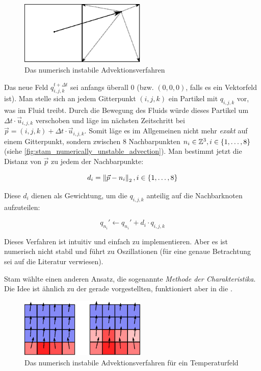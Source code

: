 \begin{figure}[ht]
\centering
\includegraphics[width=6cm]{images/advection_bad}
\caption{Das numerisch instabile Advektionsverfahren}
\label{fig:stam_numerically_unstable_advection}
\end{figure}

Das neue Feld $q_{i,j,k}^{t+\Delta t}$ sei anfangs überall 0 (bzw. $(0,0,0)$,
falls es ein Vektorfeld ist). Man stelle sich an jedem Gitterpunkt
$(i,j,k)$ ein Partikel mit  $q_{i,j,k}$ vor, was im Fluid
treibt. Durch die Bewegung des Fluids würde dieses Partikel um $\Delta t \cdot
\vec{u}_{i,j,k}$ verschoben und läge im nächsten Zeitschritt bei
$\vec{p}=(i,j,k)+\Delta t \cdot \vec{u}_{i,j,k}$. Somit läge es im Allgemeinen
nicht mehr \emph{exakt} auf einem Gitterpunkt, sondern zwischen 8 Nachbarpunkten
$n_i \in \PimiddyGanz^3, i \in \{1,\ldots,8\}$ (siehe
\autoref{fig:stam_numerically_unstable_advection}). Man bestimmt jetzt die
Distanz von $\vec{p}$ zu jedem der Nachbarpunkte:

\begin{equation}
d_i = \PimiddyNorm{2}{\vec{p} - n_i}, i \in \{1,\ldots,8\}
\end{equation}

Diese $d_i$ dienen als Gewichtung, um die  $q_{i,j,k}$
anteilig auf die Nachbarknoten aufzuteilen:

\begin{equation}
q_{n_i}' \leftarrow q_{n_i}' + d_i \cdot q_{i,j,k}
\end{equation}

Dieses Verfahren ist intuitiv und einfach zu implementieren. Aber es ist
numerisch nicht stabil und führt zu Oszillationen (für eine genaue Betrachtung
sei auf die Literatur verwiesen).

Stam wählte einen anderen Ansatz, die sogenannte \emph{Methode der
Charakteristika}. Die Idee ist ähnlich zu der gerade vorgestellten, funktioniert
aber in die .

\begin{figure}[ht]
\includegraphics[width=6cm]{images/advection_bad_example}
\caption{Das numerisch instabile Advektionsverfahren für ein Temperaturfeld}
\end{figure}

